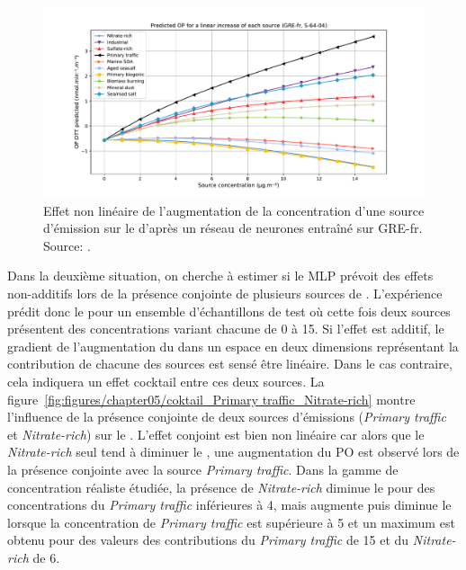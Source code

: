 \begin{figure}[ht]
    \centering
    \includegraphics[width=0.9\linewidth]{figures/chapter05/prediction_other_0_softplus-64-0.4.pdf}
    \caption{Effet non linéaire de l'augmentation de la concentration d'une source
        d'émission sur le \PODTTv{} d'après un réseau de neurones entraîné sur GRE-fr. Source: \cite{fichesMachine2020}.}%
    \label{fig:figures/chapter05/10sourcesLinearite}
\end{figure}

Dans la deuxième situation, on cherche à estimer si le MLP prévoit des effets non-additifs
lors de la présence conjointe de plusieurs sources de \PMdix. L'expérience prédit donc le
\PODTTv{} pour un ensemble d'échantillons de test où cette fois deux sources présentent des
concentrations variant chacune de 0 à \SI{15}{\ugm}.
Si l'effet est additif, le gradient de l'augmentation du \PODTTv{} dans un espace en
deux dimensions représentant la contribution de chacune des sources est sensé être
linéaire.
Dans le cas contraire, cela indiquera un effet cocktail entre ces deux sources.
La figure~\ref{fig:figures/chapter05/coktail_Primary traffic_Nitrate-rich} montre
l'influence de la présence conjointe de deux sources d'émissions (\textit{Primary traffic}
et \textit{Nitrate-rich}) sur le \PODTTv. L'effet conjoint est bien non linéaire car alors
que le \textit{Nitrate-rich} seul tend à diminuer le \PODTTv, une augmentation du PO est
observé lors de la présence conjointe avec la source \textit{Primary traffic}. Dans la gamme de
concentration réaliste étudiée, la présence de \textit{Nitrate-rich} diminue le \PODTTv{}
pour des concentrations du \textit{Primary traffic} inférieures à \SI{4}{\ugm}, mais
augmente puis diminue le \PODTTv{} lorsque la concentration de \textit{Primary traffic} est
supérieure à \SI{5}{\ugm} et un maximum est obtenu pour des valeurs des contributions du
\textit{Primary traffic} de \SI{15}{\ugm} et du \textit{Nitrate-rich} de \SI{6}{\ugm}.

